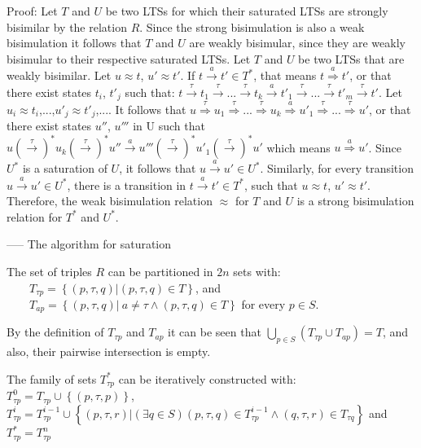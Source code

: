 Proof: Let $T$ and $U$ be two LTSs for which their saturated LTSs are strongly bisimilar by the relation $R$. Since the strong bisimulation is also a weak bisimulation it follows that $T$ and $U$ are weakly bisimular, since they are weakly bisimular to their respective saturated LTSs.
Let $T$ and $U$ be two LTSs that are weakly bisimilar. Let $u\approx t$, $u'\approx t'$. If $t\stackrel{a}{\rightarrow}t'\in T^{*}$, that means $t\stackrel{a}{\Rightarrow}t'$, or that there exist states $t_{i}$, $t'_{j}$ such that: $t\stackrel{\tau}{\rightarrow}t_{1}\stackrel{\tau}{\rightarrow}...\stackrel{\tau}{\rightarrow}t_{k}\stackrel{a}{\rightarrow}t'_{1}\stackrel{\tau}{\rightarrow}...\stackrel{\tau}{\rightarrow}t'_{m}\stackrel{\tau}{\rightarrow}t'$. Let $u_{i}\approx t_{i}$,...,$u'_{j}\approx t'_{j}$,.... It follows that $u\stackrel{\tau}{\Rightarrow}u_{1}\stackrel{\tau}{\Rightarrow}...\stackrel{\tau}{\Rightarrow}u_{k}\stackrel{a}{\Rightarrow}u'_{1}\stackrel{\tau}{\Rightarrow}...\stackrel{\tau}{\Rightarrow}u'$, or that there exist states $u''$, $u'''$ in U such that $u\left(\stackrel{\tau}{\rightarrow}\right)^{*}u_{k}\left(\stackrel{\tau}{\rightarrow}\right)^{*}u''\stackrel{a}{\rightarrow}u'''\left(\stackrel{\tau}{\rightarrow}\right)^{*}u'_{1}\left(\stackrel{\tau}{\rightarrow}\right)^{*}u'$ which means $u\stackrel{a}{\Rightarrow}u'$. Since $U^{*}$ is a saturation of $U$, it follows that $u\stackrel{a}{\rightarrow}u'\in U^{*}$.
Similarly, for every transition $u\stackrel{a}{\rightarrow}u'\in U^{*}$, there is a transition in $t\stackrel{a}{\rightarrow}t'\in T^{*}$, such that $u\approx t$, $u'\approx t'$.
Therefore, the weak bisimulation relation $\approx$ for $T$ and $U$ is a strong bisimulation relation for $T^{*}$ and $U^{*}$.

----- The algorithm for saturation

The set of triples ${R}$ can be partitioned in ${2n}$ sets with: \\
\ \ \ \ ${T_{\tau p}=\left\{\left(p,\tau,q\right)| \left(p,\tau,q\right)\in T\right\}}$, and\\
\ \ \ \ ${T_{ap}=\left\{\left(p,\tau,q\right)|\ a\neq\tau\wedge\left(p,\tau,q\right)\in T\right\}}$ for every ${p\in S}$.

By the definition of ${T_{\tau p}}$ and ${T_{ap}}$ it can be seen that ${\bigcup_{p\in S}\left(T_{\tau p}\cup T_{ap}\right)=T}$, and also, their pairwise intersection is empty. 

The family of sets ${T^{*}_{\tau p}}$ can be iteratively constructed with:\\
${T^{0}_{\tau p}=T_{\tau p}\cup\left\{\left(p,\tau,p\right)\right\}}$,\\
${T^{i}_{\tau p}=T^{i-1}_{\tau p}\cup\left\{\left(p,\tau,r\right)|\left(\exists q\in S\right)\left(p,\tau,q\right)\in T^{i-1}_{\tau p}\wedge\left(q,\tau,r\right)\in T_{\tau q}\right\}}$ and \\
${T^{*}_{\tau p}=T^{n}_{\tau p}}$

